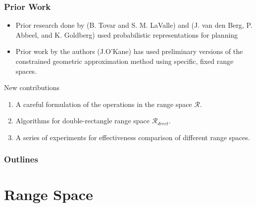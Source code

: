 \documentclass[compress]{beamer}
\begin{document}
\begin{frame}\frametitle{Prior Work}
\begin{itemize}
\item[] Prior research done by (B. Tovar and S. M. LaValle) and (J. van den Berg, P. Abbeel, and K. Goldberg)
used probabilistic representations for planning\\

\item[] Prior work by the authors (J.O'Kane) has used preliminary versions of the constrained geometric approximation method using specific, fixed range spaces. \\
\end{itemize}
New contributions
\begin{enumerate}
\item A careful formulation of the operations in the range space $\mathcal{R}$.
\item Algorithms for double-rectangle range space $\mathcal{R}_{drect}$.
\item A series of experiments for effectiveness comparison of different range spaces.
\end{enumerate}
\transboxin
\end{frame}

\begin{frame}
  \frametitle{Outlines}
  \tableofcontents[]
  \transboxout
\end{frame}
\section[Range Space]{Range Space}
\end{document}
